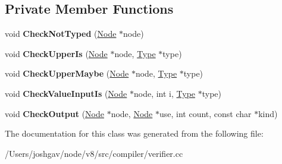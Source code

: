 \subsection*{Private Member Functions}
\begin{DoxyCompactItemize}
\item 
void {\bfseries Check\+Not\+Typed} (\hyperlink{classv8_1_1internal_1_1compiler_1_1_node}{Node} $\ast$node)\hypertarget{classv8_1_1internal_1_1compiler_1_1_verifier_1_1_visitor_a349294647350b338f2d26512dc172c58}{}\label{classv8_1_1internal_1_1compiler_1_1_verifier_1_1_visitor_a349294647350b338f2d26512dc172c58}

\item 
void {\bfseries Check\+Upper\+Is} (\hyperlink{classv8_1_1internal_1_1compiler_1_1_node}{Node} $\ast$node, \hyperlink{classv8_1_1internal_1_1_type}{Type} $\ast$type)\hypertarget{classv8_1_1internal_1_1compiler_1_1_verifier_1_1_visitor_a349950321477ffd8f5cdd98312a9699c}{}\label{classv8_1_1internal_1_1compiler_1_1_verifier_1_1_visitor_a349950321477ffd8f5cdd98312a9699c}

\item 
void {\bfseries Check\+Upper\+Maybe} (\hyperlink{classv8_1_1internal_1_1compiler_1_1_node}{Node} $\ast$node, \hyperlink{classv8_1_1internal_1_1_type}{Type} $\ast$type)\hypertarget{classv8_1_1internal_1_1compiler_1_1_verifier_1_1_visitor_afc253487b27d634bedb3addcaa9f60d1}{}\label{classv8_1_1internal_1_1compiler_1_1_verifier_1_1_visitor_afc253487b27d634bedb3addcaa9f60d1}

\item 
void {\bfseries Check\+Value\+Input\+Is} (\hyperlink{classv8_1_1internal_1_1compiler_1_1_node}{Node} $\ast$node, int i, \hyperlink{classv8_1_1internal_1_1_type}{Type} $\ast$type)\hypertarget{classv8_1_1internal_1_1compiler_1_1_verifier_1_1_visitor_acb14bc2c28c0f9a74b83e977b02a7cc6}{}\label{classv8_1_1internal_1_1compiler_1_1_verifier_1_1_visitor_acb14bc2c28c0f9a74b83e977b02a7cc6}

\item 
void {\bfseries Check\+Output} (\hyperlink{classv8_1_1internal_1_1compiler_1_1_node}{Node} $\ast$node, \hyperlink{classv8_1_1internal_1_1compiler_1_1_node}{Node} $\ast$use, int count, const char $\ast$kind)\hypertarget{classv8_1_1internal_1_1compiler_1_1_verifier_1_1_visitor_ad943c61b7c4f163a76886f6de56f3278}{}\label{classv8_1_1internal_1_1compiler_1_1_verifier_1_1_visitor_ad943c61b7c4f163a76886f6de56f3278}

\end{DoxyCompactItemize}


The documentation for this class was generated from the following file\+:\begin{DoxyCompactItemize}
\item 
/\+Users/joshgav/node/v8/src/compiler/verifier.\+cc\end{DoxyCompactItemize}
